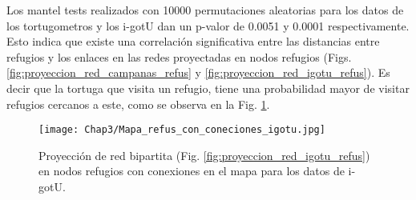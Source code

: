  
Los mantel tests realizados con 10000 permutaciones aleatorias para los datos de los tortugometros y los i-gotU dan un p-valor de 0.0051 y 0.0001 respectivamente. Esto indica que existe una correlación significativa entre las distancias entre refugios y los enlaces en las redes proyectadas en nodos refugios (Figs. \ref{fig:proyeccion_red_campanas_refus} y \ref{fig:proyeccion_red_igotu_refus}). Es decir que la tortuga que visita un refugio, tiene una probabilidad mayor de visitar refugios cercanos a este, como se observa en la Fig. \ref{fig:mapa_con_conexiones_igotu}.
 
\begin{figure}[ht]
    \begin{center}
        \texttt{[image: Chap3/Mapa\_refus\_con\_coneciones\_igotu.jpg]}
        \caption[Proyección en nodos refugios con conexiones en el mapa.]{Proyección de red bipartita (Fig. \ref{fig:proyeccion_red_igotu_refus}) en nodos refugios con conexiones en el mapa para los datos de i-gotU. }
        \label{fig:mapa_con_conexiones_igotu}
       
        \end{center}
\end{figure}
 
 
 

